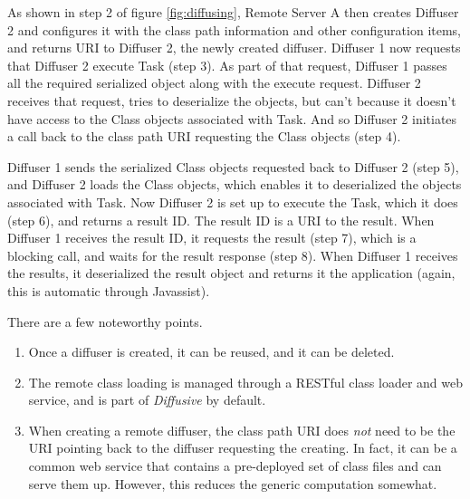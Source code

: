 \documentclass[11pt]{article}
\begin{document}
As shown in step 2 of figure \ref{fig:diffusing}, \textsf{Remote Server A} then creates \textsf{Diffuser 2} and configures it with the class path information and other configuration items, and returns URI to \textsf{Diffuser 2}, the newly created diffuser. \textsf{Diffuser 1} now requests that \textsf{Diffuser 2} execute \textsf{Task} (step 3). As part of that request, \textsf{Diffuser 1} passes all the required serialized object along with the execute request. \textsf{Diffuser 2} receives that request, tries to deserialize the objects, but can't because it doesn't have access to the \textsf{Class} objects associated with \textsf{Task}. And so \textsf{Diffuser 2} initiates a call back to the class path URI requesting the \textsf{Class} objects (step 4).

\textsf{Diffuser 1} sends the serialized \textsf{Class} objects requested back to \textsf{Diffuser 2} (step 5), and \textsf{Diffuser 2} loads the \textsf{Class} objects, which enables it to deserialized the objects associated with \textsf{Task}. Now \textsf{Diffuser 2} is set up to execute the \textsf{Task}, which it does (step 6), and returns a result ID. The result ID is a URI to the result. When \textsf{Diffuser 1} receives the result ID, it requests the result (step 7), which is a blocking call, and waits for the result response (step 8). When \textsf{Diffuser 1} receives the results, it deserialized the result object and returns it the application (again, this is automatic through Javassist).

There are a few noteworthy points. 
\begin{enumerate}
\item Once a diffuser is created, it can be reused, and it can be deleted.
\item The remote class loading is managed through a RESTful class loader and web service, and is part of \emph{Diffusive} by default.
\item When creating a remote diffuser, the class path URI does \emph{not} need to be the URI pointing back to the diffuser requesting the creating. In fact, it can be a common web service that contains a pre-deployed set of class files and can serve them up. However, this reduces the generic computation somewhat.
\end{enumerate}
\end{document}
